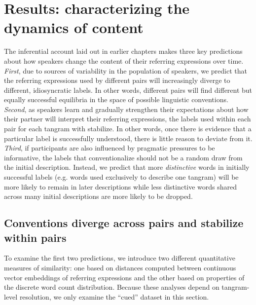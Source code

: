 \section{Results: characterizing the dynamics of content}

The inferential account laid out in earlier chapters makes three key predictions about how speakers change the content of their referring expressions over time.
\emph{First}, due to sources of variability in the population of speakers, we predict that the referring expressions used by different pairs will increasingly diverge to different, idiosyncratic labels.
In other words, different pairs will find different but equally successful equilibria in the space of possible linguistic conventions.
\emph{Second}, as speakers learn and gradually strengthen their expectations about how their partner will interpret their referring expressions, the labels used within each pair for each tangram with stabilize.
In other words, once there is evidence that a particular label is successfully understood, there is little reason to deviate from it.
\emph{Third}, if participants are also influenced by pragmatic pressures to be informative, the labels that conventionalize should not be a random draw from the initial description. 
Instead, we predict that more \emph{distinctive} words in initially successful labels (e.g. words used exclusively to describe one tangram) will be more likely to remain in later descriptions while less distinctive words shared across many initial descriptions are more likely to be dropped.

\subsection{Conventions diverge across pairs and stabilize within pairs}

To examine the first two predictions, we introduce two different quantitative measures of similarity: one based on distances computed between continuous vector embeddings of referring expressions and the other based on properties of the discrete word count distribution.
Because these analyses depend on tangram-level resolution, we only examine the ``cued'' dataset in this section.

